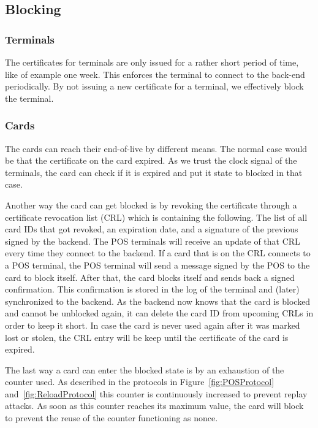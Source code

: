 \subsection{Blocking}
\subsubsection{Terminals}
The certificates for terminals are only issued for a rather short period of time, like of example one week.
This enforces the terminal to connect to the back-end periodically.
By not issuing a new certificate for a terminal, we effectively block the terminal.

\subsubsection{Cards}
The cards can reach their end-of-live by different means.
The normal case would be that the certificate on the card expired.
As we trust the clock signal of the terminals, the card can check if it is expired and put it state to blocked in that case.

Another way the card can get blocked is by revoking the certificate through a certificate revocation list (CRL) which is containing the following.
The list of all card IDs that got revoked, an expiration date, and a signature of the previous signed by the backend.
The POS terminals will receive an update of that CRL every time they connect to the backend.
If a card that is on the CRL connects to a POS terminal, the POS terminal will send a message signed by the POS to the card to block itself.
After that, the card blocks itself and sends back a signed confirmation.
This confirmation is stored in the log of the terminal and (later) synchronized to the backend.
As the backend now knows that the card is blocked and cannot be unblocked again, it can delete the card ID from upcoming CRLs in order to keep it short.
In case the card is never used again after it was marked lost or stolen, the CRL entry will be keep until the certificate of the card is expired.


The last way a card can enter the blocked state is by an exhaustion of the counter used.
As described in the protocols in Figure~\ref{fig:POSProtocol} and~\ref{fig:ReloadProtocol} this counter is continuously increased to prevent replay attacks.
As soon as this counter reaches its maximum value, the card will block to prevent the reuse of the counter functioning as nonce.


